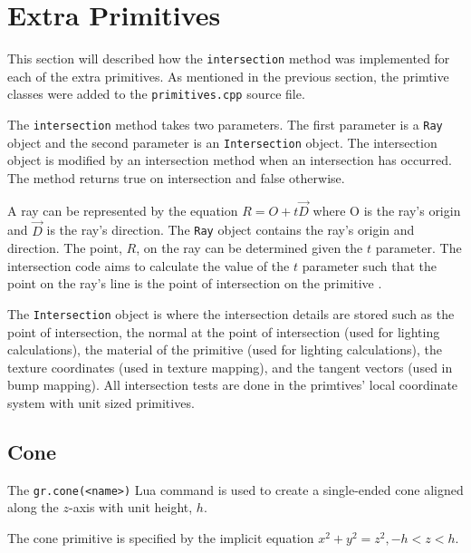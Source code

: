\section{Extra Primitives}

This section will described how the \verb|intersection| method was
implemented for each of the extra primitives. As mentioned in the 
previous section, the primtive classes were added to the \verb|primitives.cpp| 
source file.

The \verb|intersection| method takes two parameters. The first parameter is a
\verb|Ray| object and the second parameter is an \verb|Intersection| object. The 
intersection object is modified by an intersection method when an intersection 
has occurred. The method returns true on intersection and false otherwise.

A ray can be represented by the equation $R = O + t\vec{D}$ where
O is the ray's origin and $\vec{D}$ is the ray's direction. The \verb|Ray| 
object contains the ray's origin and direction. The point, $R$, on the ray can 
be determined given the $t$ parameter. The intersection code aims to calculate 
the value of the $t$ parameter such that the point on the ray's line is the 
point of intersection on the primitive \cite{5_drakos_1997}. 

The \verb|Intersection| object is where the intersection details are
stored such as the point of intersection, the normal at the point of
intersection (used for lighting calculations), the material of the primitive
(used for lighting calculations), the texture coordinates (used in texture
mapping), and the tangent vectors (used in bump mapping). All intersection tests 
are done in the primtives' local coordinate system with unit sized primitives.

\subsection*{Cone}
The \verb|gr.cone(<name>)| Lua command is used to create a single-ended cone 
aligned along the $z$-axis with unit height, $h$.

The cone primitive is specified by the implicit equation $x^2 + y^2 = z^2, -h <
z < h$.

